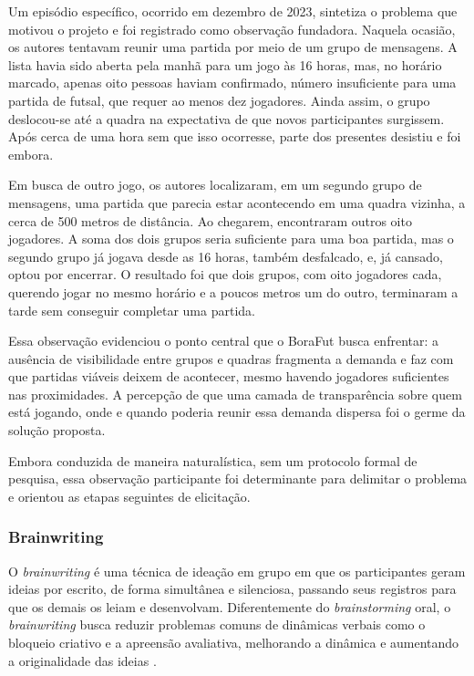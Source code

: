             Um episódio específico, ocorrido em dezembro de 2023, sintetiza o problema que motivou o projeto e foi registrado como observação fundadora. Naquela ocasião, os autores tentavam reunir uma partida por meio de um grupo de mensagens. A lista havia sido aberta pela manhã para um jogo às 16 horas, mas, no horário marcado, apenas oito pessoas haviam confirmado, número insuficiente para uma partida de futsal, que requer ao menos dez jogadores. Ainda assim, o grupo deslocou-se até a quadra na expectativa de que novos participantes surgissem. Após cerca de uma hora sem que isso ocorresse, parte dos presentes desistiu e foi embora.

            Em busca de outro jogo, os autores localizaram, em um segundo grupo de mensagens, uma partida que parecia estar acontecendo em uma quadra vizinha, a cerca de 500 metros de distância. Ao chegarem, encontraram outros oito jogadores. A soma dos dois grupos seria suficiente para uma boa partida, mas o segundo grupo já jogava desde as 16 horas, também desfalcado, e, já cansado, optou por encerrar. O resultado foi que dois grupos, com oito jogadores cada, querendo jogar no mesmo horário e a poucos metros um do outro, terminaram a tarde sem conseguir completar uma partida.

            Essa observação evidenciou o ponto central que o BoraFut busca enfrentar: a ausência de visibilidade entre grupos e quadras fragmenta a demanda e faz com que partidas viáveis deixem de acontecer, mesmo havendo jogadores suficientes nas proximidades. A percepção de que uma camada de transparência sobre quem está jogando, onde e quando poderia reunir essa demanda dispersa foi o germe da solução proposta.

            Embora conduzida de maneira naturalística, sem um protocolo formal de pesquisa, essa observação participante foi determinante para delimitar o problema e orientou as etapas seguintes de elicitação.

        \subsubsection{Brainwriting}

            O \textit{brainwriting} é uma técnica de ideação em grupo em que os participantes geram ideias por escrito, de forma simultânea e silenciosa, passando seus registros para que os demais os leiam e desenvolvam. Diferentemente do \textit{brainstorming} oral, o \textit{brainwriting} busca reduzir problemas comuns de dinâmicas verbais como o bloqueio criativo e a apreensão avaliativa, melhorando a dinâmica e aumentando a originalidade das ideias \cite{paulus2007, pressman2019}.

